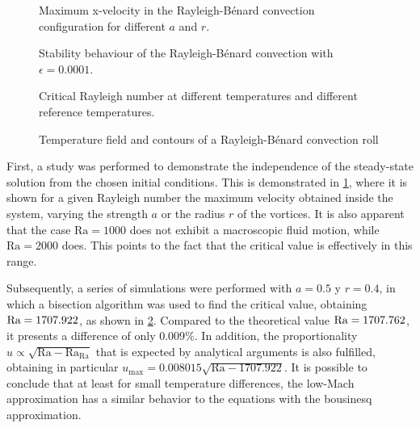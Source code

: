 \begin{figure}[bt]
	\centering
	\pgfplotsset{width=0.31\textwidth, compat=1.3}
	\hspace{0.2cm}
	\caption{Maximum x-velocity in the Rayleigh-Bénard convection configuration for different $a$ and $r$.}
	\label{fig:RayBerMaxVel}
\end{figure}

\begin{figure}[bt]
	\centering
	\caption{Stability behaviour of the Rayleigh-Bénard convection with $\epsilon = 0.0001$.} \label{fig:ReyBerCritRa}
\end{figure}
\begin{figure}[bt]
	\pgfplotsset{width=0.45\textwidth, compat=1.3}
	\centering
\caption{Critical Rayleigh number at different temperatures and different reference temperatures.}\label{fig:RayBenardTemperatureRaPlot}
\end{figure}

\begin{figure}[b]
	\centering
	\pgfplotsset{width=0.31\textwidth, compat=1.3}
	\par\bigskip
	\caption{Temperature field and contours of a Rayleigh-Bénard convection roll} \label{fig:RayBenTemperatureField}
\end{figure}
First, a study was performed to demonstrate the independence of the steady-state solution from the chosen initial conditions. This is demonstrated in \cref{fig:RayBerMaxVel}, where it is shown for a given Rayleigh number the maximum velocity obtained inside the system, varying the strength $a$ or the radius $r$ of the vortices. It is also apparent that the case $\text{Ra} = 1000$ does not exhibit a macroscopic fluid motion, while $\text{Ra} = 2000$ does. This points to the fact that the critical value is effectively in this range. 

Subsequently, a series of simulations were performed with $a = 0.5$ y $r = 0.4$, in which a bisection algorithm was used to find the critical value, obtaining $\text{Ra} = 1707.922$, as shown in \cref{fig:ReyBerCritRa}. Compared to the theoretical value $\text{Ra} = 1707.762$, it presents a difference of only $0.009\%$. In addition, the proportionality  $u \propto \sqrt{\text{Ra}- \text{Ra}_\text{Ra}}$  that is expected by analytical arguments is also fulfilled, obtaining in particular $u_{\text{max}}  = 0.008015\sqrt{\text{Ra} - 1707.922}$. It is possible to conclude that at least for small temperature differences, the low-Mach approximation has a similar behavior to the equations with the bousinesq approximation. 

